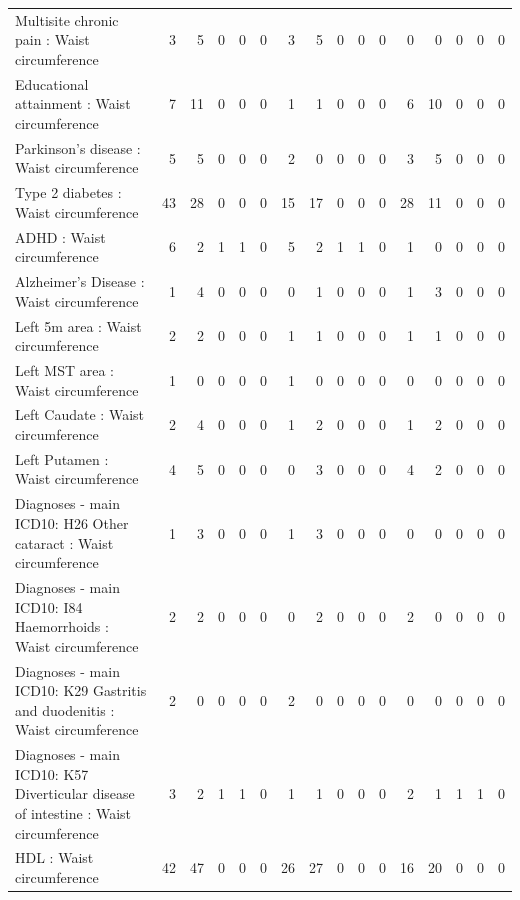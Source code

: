 \begin{table}[ht]
\begin{tabular}{lrrrrrrrrrrrrrrr}
  Multisite chronic pain : Waist circumference  &   3 &   5 &   0 &   0 &   0 &   3 &   5 &   0 &   0 &   0 &   0 &   0 &   0 &   0 &   0 \\ 
  Educational attainment : Waist circumference  &   7 &  11 &   0 &   0 &   0 &   1 &   1 &   0 &   0 &   0 &   6 &  10 &   0 &   0 &   0 \\ 
  Parkinson's disease : Waist circumference  &   5 &   5 &   0 &   0 &   0 &   2 &   0 &   0 &   0 &   0 &   3 &   5 &   0 &   0 &   0 \\ 
  Type 2 diabetes : Waist circumference  &  43 &  28 &   0 &   0 &   0 &  15 &  17 &   0 &   0 &   0 &  28 &  11 &   0 &   0 &   0 \\ 
  ADHD : Waist circumference  &   6 &   2 &   1 &   1 &   0 &   5 &   2 &   1 &   1 &   0 &   1 &   0 &   0 &   0 &   0 \\ 
  Alzheimer's Disease : Waist circumference  &   1 &   4 &   0 &   0 &   0 &   0 &   1 &   0 &   0 &   0 &   1 &   3 &   0 &   0 &   0 \\ 
  Left 5m area : Waist circumference  &   2 &   2 &   0 &   0 &   0 &   1 &   1 &   0 &   0 &   0 &   1 &   1 &   0 &   0 &   0 \\ 
  Left MST area : Waist circumference  &   1 &   0 &   0 &   0 &   0 &   1 &   0 &   0 &   0 &   0 &   0 &   0 &   0 &   0 &   0 \\ 
  Left Caudate : Waist circumference  &   2 &   4 &   0 &   0 &   0 &   1 &   2 &   0 &   0 &   0 &   1 &   2 &   0 &   0 &   0 \\ 
  Left Putamen : Waist circumference  &   4 &   5 &   0 &   0 &   0 &   0 &   3 &   0 &   0 &   0 &   4 &   2 &   0 &   0 &   0 \\ 
  Diagnoses - main ICD10: H26 Other cataract : Waist circumference  &   1 &   3 &   0 &   0 &   0 &   1 &   3 &   0 &   0 &   0 &   0 &   0 &   0 &   0 &   0 \\ 
  Diagnoses - main ICD10: I84 Haemorrhoids : Waist circumference  &   2 &   2 &   0 &   0 &   0 &   0 &   2 &   0 &   0 &   0 &   2 &   0 &   0 &   0 &   0 \\ 
  Diagnoses - main ICD10: K29 Gastritis and duodenitis : Waist circumference  &   2 &   0 &   0 &   0 &   0 &   2 &   0 &   0 &   0 &   0 &   0 &   0 &   0 &   0 &   0 \\ 
  Diagnoses - main ICD10: K57 Diverticular disease of intestine : Waist circumference  &   3 &   2 &   1 &   1 &   0 &   1 &   1 &   0 &   0 &   0 &   2 &   1 &   1 &   1 &   0 \\ 
  HDL : Waist circumference  &  42 &  47 &   0 &   0 &   0 &  26 &  27 &   0 &   0 &   0 &  16 &  20 &   0 &   0 &   0 \\ 

\end{tabular}
\end{table}
